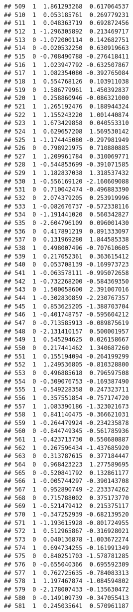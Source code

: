 \documentclass[
]{article}
\begin{document}
\begin{verbatim}
## 509  1  1.861293268  0.617064537
## 510  1  0.053185761  0.269779231
## 511  1  0.048363719  0.692872456
## 512  1 -1.296305892  0.213469717
## 513  0 -1.072000114  0.142682751
## 514  0 -0.020532250  0.630919663
## 515  0 -0.708490788 -0.276418411
## 516  1  1.023947792 -0.632507867
## 517  1  1.082354080 -0.392765084
## 518  1  0.554768126  0.103911038
## 519  0  1.586779961  1.450392837
## 520  1  0.258860946 -0.086321000
## 521  1  1.265192476  0.188944324
## 522  1  1.155243220  1.001440874
## 523  1  1.673429858  0.040553310
## 524  1  0.629657208  1.569530142
## 525  1 -1.174445080 -0.297981949
## 526  0  0.798921975  0.710880885
## 527  1  1.209961784  0.310069771
## 528  1 -0.544853699 -0.391071585
## 529  1  1.182837038  1.318537432
## 530  1 -0.556169120 -2.160609088
## 531  0  0.710042474 -0.496883390
## 532  0  2.074379205  0.253919996
## 533  1 -0.082676737 -0.572338116
## 534  0 -1.191441020  0.560342827
## 535  0 -2.604796109  0.096001430
## 536  0  0.417891219  0.891333097
## 537  0  0.131969280  1.844585338
## 538  1  0.498007496 -0.707610605
## 539  1  0.217052361  0.363615412
## 540  0  0.053708139 -0.169973723
## 541  1 -0.063578111 -0.995072658
## 542  1 -0.732268200 -0.584369350
## 543  0  1.500058600  2.391007016
## 544  1 -0.302830859 -2.230767357
## 545  1  0.853625205 -1.388703704
## 546  1 -0.401748757 -0.595604212
## 547  0 -0.713585913 -0.089875619
## 548  0 -2.131410157  0.500001957
## 549  1  0.545294625  0.026158667
## 550  0  0.217441462  1.340687260
## 551  1  0.155194094 -0.264199299
## 552  1  1.249536805 -0.810328800
## 553  0  0.496885618  0.796597508
## 554  0 -0.309076753 -0.169387490
## 555  1 -0.549228358  0.247323711
## 556  1  0.357551854 -0.757174720
## 557  1  1.083390186 -1.323021673
## 558  1  0.841140475 -0.366621031
## 559  1 -0.264479924 -0.234235878
## 560  0 -0.844749345 -0.561785936
## 561  1 -0.423713730  0.550680887
## 562  1  0.267596434 -1.437685920
## 563  0  0.313787615  0.377184447
## 564  0  0.968423223  1.277589695
## 565  0 -0.520841792  0.132861177
## 566  1 -0.005744297 -0.390143708
## 567  1  0.952890749 -2.233374262
## 568  0  0.715788002  0.375173770
## 569  1 -0.521479412  0.215375117
## 570  1 -0.347252939 -0.682139520
## 571  1 -1.193615928 -0.801724955
## 572  1  0.512965867 -0.316928021
## 573  0  0.040136878 -1.003672274
## 574  1  0.694734255 -0.161991349
## 575  0  0.840251703 -1.578781285
## 576  0 -0.655040366  0.695592309
## 577  1  0.762725635 -0.784083313
## 578  1  1.197467874 -1.084594802
## 579  0 -2.178007433 -0.135630472
## 580  0 -0.149109739 -0.347055413
## 581  1  0.245035641  0.570961187

\end{verbatim}
\end{document}
